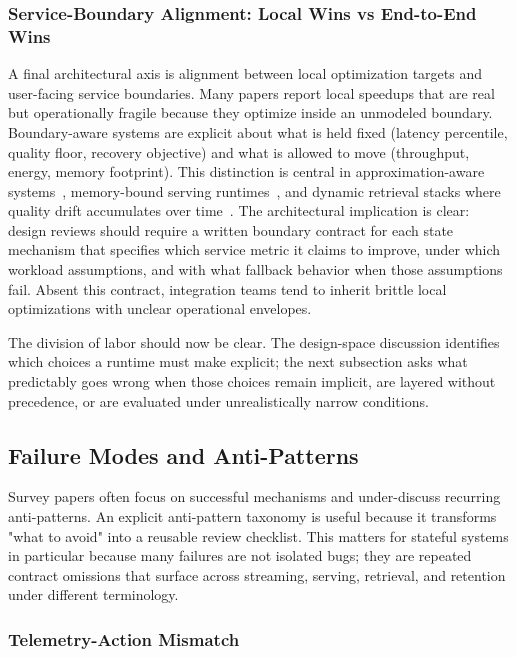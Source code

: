 \documentclass[acmsmall,screen,review]{acmart}
\begin{document}
\subsubsection{Service-Boundary Alignment: Local Wins vs End-to-End Wins}

A final architectural axis is alignment between local optimization targets and user-facing service boundaries. Many papers report local speedups that are real but operationally fragile because they optimize inside an unmodeled boundary. Boundary-aware systems are explicit about what is held fixed (latency percentile, quality floor, recovery objective) and what is allowed to move (throughput, energy, memory footprint). This distinction is central in approximation-aware systems~\cite{zeng2024pecj,zeng2024libamm}, memory-bound serving runtimes~\cite{gujarati2020clockwork,kwon2023pagedattention}, and dynamic retrieval stacks where quality drift accumulates over time~\cite{asai2024selfrag,wang2024hipporag}. The architectural implication is clear: design reviews should require a written boundary contract for each state mechanism that specifies which service metric it claims to improve, under which workload assumptions, and with what fallback behavior when those assumptions fail. Absent this contract, integration teams tend to inherit brittle local optimizations with unclear operational envelopes.

The division of labor should now be clear. The design-space discussion identifies which choices a runtime must make explicit; the next subsection asks what predictably goes wrong when those choices remain implicit, are layered without precedence, or are evaluated under unrealistically narrow conditions.

\subsection{Failure Modes and Anti-Patterns}

Survey papers often focus on successful mechanisms and under-discuss recurring anti-patterns. An explicit anti-pattern taxonomy is useful because it transforms "what to avoid" into a reusable review checklist. This matters for stateful systems in particular because many failures are not isolated bugs; they are repeated contract omissions that surface across streaming, serving, retrieval, and retention under different terminology.

\subsubsection{Telemetry-Action Mismatch}
\end{document}
